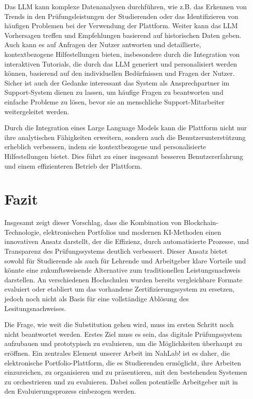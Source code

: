 \documentclass[conference]{IEEEtran}
\begin{document}
Das LLM kann komplexe Datenanalysen durchführen, wie z.B. das Erkennen von Trends in den Prüfungsleistungen der Studierenden oder das Identifizieren von häufigen Problemen bei der Verwendung der Plattform. Weiter kann das LLM  Vorhersagen treffen und Empfehlungen basierend auf historischen Daten geben.
Auch kann es auf Anfragen der Nutzer antworten und detaillierte, kontextbezogene Hilfestellungen bieten, insbesondere durch die  Integration von interaktiven Tutorials, die durch das LLM generiert und personalisiert werden können, basierend auf den individuellen Bedürfnissen und Fragen der Nutzer. \\
Sicher ist auch der Gedanke interessant das System als Ansprechpartner im Support-System dienen zu lassen, um häufige Fragen zu beantworten und einfache Probleme zu lösen, bevor sie an menschliche Support-Mitarbeiter weitergeleitet werden.

Durch die Integration eines Large Language Models kann die Plattform nicht nur ihre analytischen Fähigkeiten erweitern, sondern auch die Benutzerunterstützung erheblich verbessern, indem sie kontextbezogene und personalisierte Hilfestellungen bietet. Dies führt zu einer insgesamt besseren Benutzererfahrung und einem effizienteren Betrieb der Plattform.

\section{Fazit}
Insgesamt zeigt dieser Vorschlag, dass die Kombination von Blockchain-Technologie, elektronischen Portfolios und modernen KI-Methoden einen innovativen Ansatz darstellt, der die Effizienz, durch automatisierte Prozesse, und Transparenz des Prüfungssystems deutlich verbessert. Dieser Ansatz bietet sowohl für Studierende als auch für Lehrende und Arbeitgeber klare Vorteile und könnte eine zukunftsweisende Alternative zum traditionellen Leistungsnachweis  darstellen. An verschiedenen Hochschulen wurden bereits vergleichbare Formate evaluiert oder etabliert um das vorhandene Zertifizierungssystem zu ersetzen, jedoch noch nicht als Basis für eine vollständige Ablösung des Lesitungsnachweises.

Die Frage, wie weit die Substitution gehen wird, muss im ersten Schritt noch nicht beantwortet werden. Erstes Ziel muss es sein, das digitale Prüfungssystem aufzubauen und prototypisch zu evaluieren, um die Möglichkeiten überhaupt zu eröffnen. Ein zentrales Element unserer Arbeit im NahLab! ist es daher, die elektronische Portfolio-Plattform, die es Studierenden ermöglicht, ihre Arbeiten einzureichen, zu organisieren und zu präsentieren, mit den bestehenden Systemen zu orchestrieren und zu evaluieren. Dabei sollen potentielle Arbeitgeber mit in den Evaluierungsprozess einbezogen werden.
\end{document}
